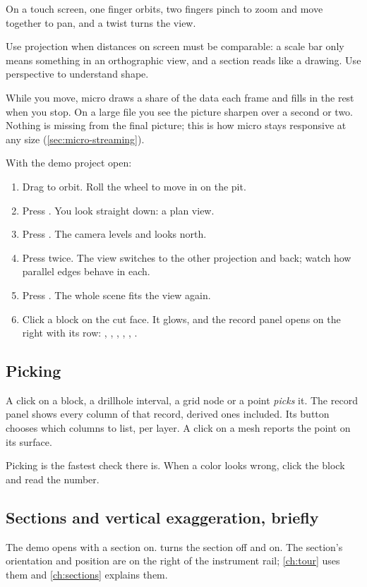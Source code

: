 On a touch screen, one finger orbits, two fingers pinch to zoom and move together to pan, and a twist turns the view.

Use  projection when distances on screen must be comparable: a scale bar only means something in an orthographic view, and a section reads like a drawing. Use perspective to understand shape.

While you move, micro draws a share of the data each frame and fills in the rest when you stop. On a large file you see the picture sharpen over a second or two. Nothing is missing from the final picture; this is how micro stays responsive at any size (\cref{sec:micro-streaming}).

\begin{tryit}
With the demo project open:
\begin{enumerate}
\item Drag to orbit. Roll the wheel to move in on the pit.
\item Press . You look straight down: a plan view.
\item Press . The camera levels and looks north.
\item Press  twice. The view switches to the other projection and back; watch how parallel edges behave in each.
\item Press . The whole scene fits the view again.
\item Click a block on the cut face. It glows, and the record panel opens on the right with its row: , , , , , .
\end{enumerate}
\end{tryit}

\subsection{Picking}
A click on a block, a drillhole interval, a grid node or a point \emph{picks} it. The record panel shows every column of that record, derived ones included. Its  button chooses which columns to list, per layer. A click on a mesh reports the point on its surface.

Picking is the fastest check there is. When a color looks wrong, click the block and read the number.

\subsection{Sections and vertical exaggeration, briefly}
The demo opens with a section on.  turns the section off and on. The section's orientation and position are on the right of the instrument rail; \cref{ch:tour} uses them and \cref{ch:sections} explains them.

